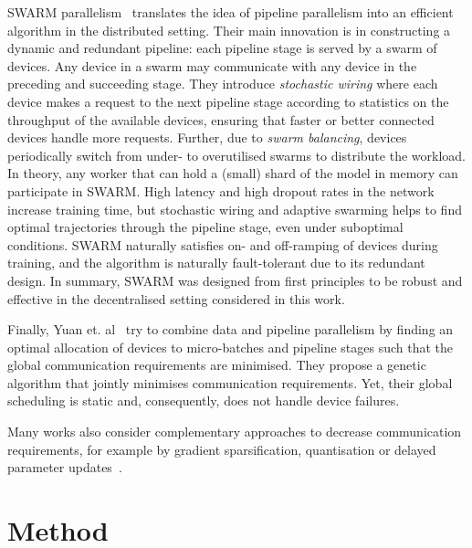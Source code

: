 \documentclass[conference, 10pt]{IEEEtran}
\begin{document}
SWARM parallelism~\cite{ryabinin2023} translates the idea of pipeline
parallelism into an efficient algorithm in the distributed setting. Their main
innovation is in constructing a dynamic and redundant pipeline: each pipeline
stage is served by a swarm of devices. Any device in a swarm may communicate
with any device in the preceding and succeeding stage. They introduce
\textit{stochastic wiring} where each device makes a request to the next
pipeline stage according to statistics on the throughput of the available
devices, ensuring that faster or better connected devices handle more requests.
Further, due to \textit{swarm balancing}, devices periodically switch from
under- to overutilised swarms to distribute the workload. In theory, any worker
that can hold a (small) shard of the model in memory can participate in SWARM. 
High latency and high dropout rates in the network increase training time, but 
stochastic wiring and adaptive swarming helps to find optimal trajectories
through the pipeline stage, even under suboptimal conditions. SWARM naturally
satisfies on- and off-ramping of devices during training, and the algorithm is
naturally fault-tolerant due to its redundant design. In summary, SWARM was
designed from first principles to be robust and effective in the decentralised
setting considered in this work.

Finally, Yuan et. al~\cite{yuan2022} try to combine data and pipeline
parallelism by finding an optimal allocation of devices to micro-batches and
pipeline stages such that the global communication requirements are minimised.
They propose a genetic algorithm that jointly minimises communication
requirements. Yet, their global scheduling is static and, consequently, does not
handle device failures.

Many works also consider complementary approaches to decrease communication
requirements, for example by gradient sparsification, quantisation or delayed
parameter updates~\cite{yuan2022, ryabinin2023, tang2020}.

\section{Method}
\label{sec:method}

\end{document}
